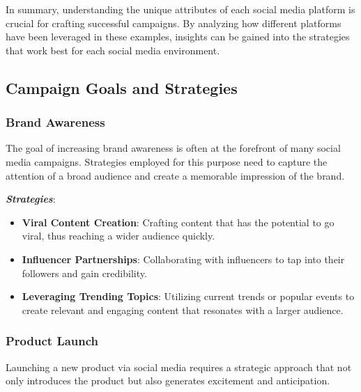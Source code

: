 \documentclass[
]{book}
\providecommand{\tightlist}{%
  \setlength{\itemsep}{0pt}\setlength{\parskip}{0pt}}
\begin{document}
In summary, understanding the unique attributes of each social media platform is crucial for crafting successful campaigns. By analyzing how different platforms have been leveraged in these examples, insights can be gained into the strategies that work best for each social media environment.

\hypertarget{campaign-goals-and-strategies}{%
\subsection*{Campaign Goals and Strategies}\label{campaign-goals-and-strategies}}

\hypertarget{brand-awareness}{%
\subsubsection*{Brand Awareness}\label{brand-awareness}}

The goal of increasing brand awareness is often at the forefront of many social media campaigns. Strategies employed for this purpose need to capture the attention of a broad audience and create a memorable impression of the brand.

\textbf{\emph{Strategies}}:

\begin{itemize}
\tightlist
\item
  \textbf{Viral Content Creation}: Crafting content that has the potential to go viral, thus reaching a wider audience quickly.
\item
  \textbf{Influencer Partnerships}: Collaborating with influencers to tap into their followers and gain credibility.
\item
  \textbf{Leveraging Trending Topics}: Utilizing current trends or popular events to create relevant and engaging content that resonates with a larger audience.
\end{itemize}

\hypertarget{product-launch}{%
\subsubsection*{Product Launch}\label{product-launch}}

Launching a new product via social media requires a strategic approach that not only introduces the product but also generates excitement and anticipation.
\end{document}
